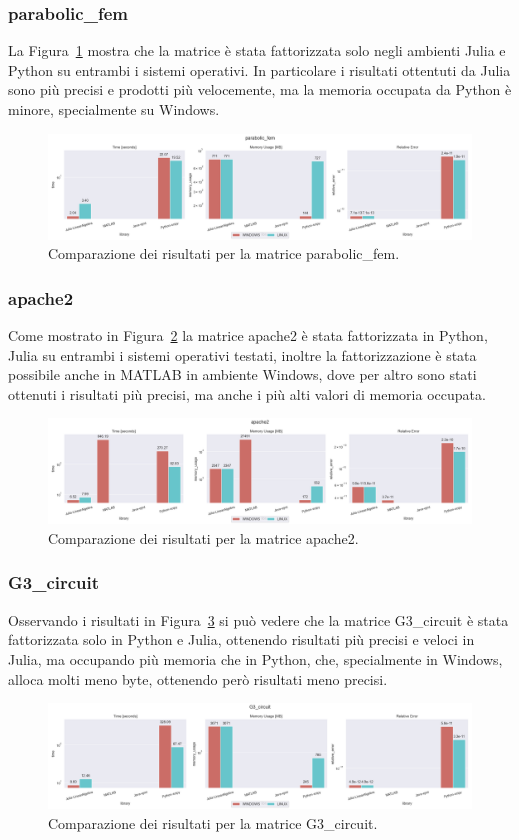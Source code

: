 \documentclass[a4paper, 12pt]{article}
\begin{document}
\subsubsection{parabolic\_fem}
La Figura~\ref{fig:parabolic_fem} mostra che la matrice è stata fattorizzata
solo negli ambienti Julia e Python su entrambi i sistemi operativi.
In particolare i risultati ottentuti da Julia sono più precisi e prodotti più
velocemente, ma la memoria occupata da Python è minore, specialmente su Windows.
\begin{figure}[ht]
\includegraphics[width=\textwidth]{parabolic_fem}
\caption{Comparazione dei risultati per la matrice parabolic\_fem.}
\label{fig:parabolic_fem}
\end{figure}
\subsubsection{apache2}
Come mostrato in Figura~\ref{fig:apache2} la matrice apache2 è stata
fattorizzata in Python, Julia su entrambi i sistemi operativi testati, inoltre
la fattorizzazione è stata possibile anche in MATLAB in ambiente Windows, dove
per altro sono stati ottenuti i risultati più precisi, ma anche i più alti
valori di memoria occupata.
\begin{figure}[ht]
\includegraphics[width=\textwidth]{apache2}
\caption{Comparazione dei risultati per la matrice apache2.}
\label{fig:apache2}
\end{figure}
\subsubsection{G3\_circuit}
Osservando i risultati in Figura~\ref{fig:G3_circuit} si può vedere che la
matrice G3\_circuit è stata fattorizzata solo in Python e Julia, ottenendo
risultati più precisi e veloci in Julia, ma occupando più memoria che in Python,
che, specialmente in Windows, alloca molti meno byte, ottenendo però risultati
meno precisi.
\begin{figure}[ht]
\includegraphics[width=\textwidth]{G3_circuit}
\caption{Comparazione dei risultati per la matrice G3\_circuit.}
\label{fig:G3_circuit}
\end{figure}
\end{document}
